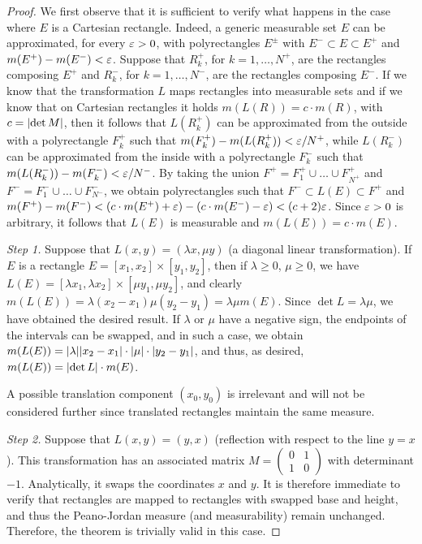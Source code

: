 \begin{proof}

We first observe that it is sufficient to verify what happens in the case where
$E$ is a Cartesian rectangle. Indeed, a generic measurable set $E$ can be
approximated, for every $\varepsilon>0$, with polyrectangles $E^\pm$ with $E^-\subset E
\subset E^+$ and $m(E^+) - m(E^-) < \varepsilon$. Suppose that $R^+_k$, for $k=1,\dots,
N^+$, are the rectangles composing $E^+$ and $R^-_k$, for $k=1,\dots, N^-$, are
the rectangles composing $E^-$. If we know that the transformation $L$ maps
rectangles into measurable sets and if we know that on Cartesian rectangles it
holds $m(L(R)) = c \cdot m(R)$, with $c= {\left|\det M\right|}$, then it follows that
$L(R_k^+)$ can be approximated from the outside with a polyrectangle $F_k^+$
such that $m(F_k^+) - m(L(R_k^+)) < \varepsilon/N^+$, while $L(R_k^-)$ can be
approximated from the inside with a polyrectangle $F_k^-$ such that
$m(L(R_k^-))-m(F_k^-) < \varepsilon/N^-$. By taking the union $F^+ = F_1^+ \cup \dots
\cup F_{N^+}^+$ and $F^- = F_1^- \cup \dots \cup F_{N^-}^-$, we obtain
polyrectangles such that $F^- \subset L(E)\subset F^+$ and $m(F^+) - m(F^-) <
(c\cdot  m(E^+) + \varepsilon) - (c \cdot m(E^-) -\varepsilon) < (c+2) \varepsilon$. Since $\varepsilon>0$
is arbitrary, it follows that $L(E)$ is measurable and $m(L(E)) = c\cdot  m(E)$.

\emph{Step 1.}
Suppose that $L(x,y) = (\lambda x,\mu y)$ (a diagonal linear transformation). If
$E$ is a rectangle $E=[x_1,x_2]\times[y_1,y_2]$, then if $\lambda\ge 0$, $\mu\ge
0$, we have $L(E) = [\lambda x_1, \lambda x_2] \times [\mu y_1, \mu y_2]$, and
clearly $m(L(E)) = \lambda (x_2-x_1) \mu (y_2-y_1) = \lambda \mu m(E)$. Since
$\det L = \lambda \mu$, we have obtained the desired result. If $\lambda$ or
$\mu$ have a negative sign, the endpoints of the intervals can be swapped, and
in such a case, we obtain $m(L(E)) = {\left|\lambda\right|}{\left|x_2-x_1\right|} \cdot {\left|\mu\right|}
\cdot {\left|y_2-y_1\right|}$, and thus, as desired, $m(L(E))={\left|\det L\right|} \cdot m(E)$.

A possible translation component $(x_0,y_0)$ is irrelevant and will not be
considered further since translated rectangles maintain the same measure.

\emph{Step 2.}
Suppose that $L(x,y) = (y,x)$ (reflection with respect to the line $y=x$). This transformation has an associated matrix $M=\begin{pmatrix}0&1\\1&0\end{pmatrix}$ with determinant $-1$. Analytically, it swaps the coordinates $x$ and $y$. It is therefore immediate to verify that rectangles are mapped to rectangles with swapped base and height, and thus the Peano-Jordan measure (and measurability) remain unchanged. Therefore, the theorem is trivially valid in this case.


\end{proof}
